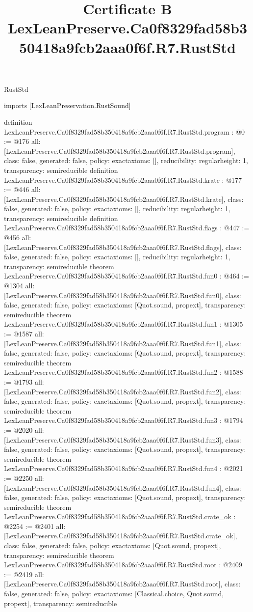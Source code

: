 \begin{lexlean}{RustStd}
\title{Certificate B LexLeanPreserve.Ca0f8329fad58b350418a9fcb2aaa0f6f.R7.RustStd}
\begin{coremodule}
imports [LexLeanPreservation.RustSound]

definition LexLeanPreserve.Ca0f8329fad58b350418a9fcb2aaa0f6f.R7.RustStd.program : @0 := @176 {
  all: [LexLeanPreserve.Ca0f8329fad58b350418a9fcb2aaa0f6f.R7.RustStd.program],
  class: false,
  generated: false,
  policy: exact{axioms: []},
  reducibility: regular{height: 1},
  transparency: semireducible
}
definition LexLeanPreserve.Ca0f8329fad58b350418a9fcb2aaa0f6f.R7.RustStd.krate : @177 := @446 {
  all: [LexLeanPreserve.Ca0f8329fad58b350418a9fcb2aaa0f6f.R7.RustStd.krate],
  class: false,
  generated: false,
  policy: exact{axioms: []},
  reducibility: regular{height: 1},
  transparency: semireducible
}
definition LexLeanPreserve.Ca0f8329fad58b350418a9fcb2aaa0f6f.R7.RustStd.flags : @447 := @456 {
  all: [LexLeanPreserve.Ca0f8329fad58b350418a9fcb2aaa0f6f.R7.RustStd.flags],
  class: false,
  generated: false,
  policy: exact{axioms: []},
  reducibility: regular{height: 1},
  transparency: semireducible
}
theorem LexLeanPreserve.Ca0f8329fad58b350418a9fcb2aaa0f6f.R7.RustStd.fun0 : @464 := @1304 {
  all: [LexLeanPreserve.Ca0f8329fad58b350418a9fcb2aaa0f6f.R7.RustStd.fun0],
  class: false,
  generated: false,
  policy: exact{axioms: [Quot.sound, propext]},
  transparency: semireducible
}
theorem LexLeanPreserve.Ca0f8329fad58b350418a9fcb2aaa0f6f.R7.RustStd.fun1 : @1305 := @1587 {
  all: [LexLeanPreserve.Ca0f8329fad58b350418a9fcb2aaa0f6f.R7.RustStd.fun1],
  class: false,
  generated: false,
  policy: exact{axioms: [Quot.sound, propext]},
  transparency: semireducible
}
theorem LexLeanPreserve.Ca0f8329fad58b350418a9fcb2aaa0f6f.R7.RustStd.fun2 : @1588 := @1793 {
  all: [LexLeanPreserve.Ca0f8329fad58b350418a9fcb2aaa0f6f.R7.RustStd.fun2],
  class: false,
  generated: false,
  policy: exact{axioms: [Quot.sound, propext]},
  transparency: semireducible
}
theorem LexLeanPreserve.Ca0f8329fad58b350418a9fcb2aaa0f6f.R7.RustStd.fun3 : @1794 := @2020 {
  all: [LexLeanPreserve.Ca0f8329fad58b350418a9fcb2aaa0f6f.R7.RustStd.fun3],
  class: false,
  generated: false,
  policy: exact{axioms: [Quot.sound, propext]},
  transparency: semireducible
}
theorem LexLeanPreserve.Ca0f8329fad58b350418a9fcb2aaa0f6f.R7.RustStd.fun4 : @2021 := @2250 {
  all: [LexLeanPreserve.Ca0f8329fad58b350418a9fcb2aaa0f6f.R7.RustStd.fun4],
  class: false,
  generated: false,
  policy: exact{axioms: [Quot.sound, propext]},
  transparency: semireducible
}
theorem LexLeanPreserve.Ca0f8329fad58b350418a9fcb2aaa0f6f.R7.RustStd.crate_ok : @2254 := @2401 {
  all: [LexLeanPreserve.Ca0f8329fad58b350418a9fcb2aaa0f6f.R7.RustStd.crate_ok],
  class: false,
  generated: false,
  policy: exact{axioms: [Quot.sound, propext]},
  transparency: semireducible
}
theorem LexLeanPreserve.Ca0f8329fad58b350418a9fcb2aaa0f6f.R7.RustStd.root : @2409 := @2419 {
  all: [LexLeanPreserve.Ca0f8329fad58b350418a9fcb2aaa0f6f.R7.RustStd.root],
  class: false,
  generated: false,
  policy: exact{axioms: [Classical.choice, Quot.sound, propext]},
  transparency: semireducible
}


\end{coremodule}
\end{lexlean}
